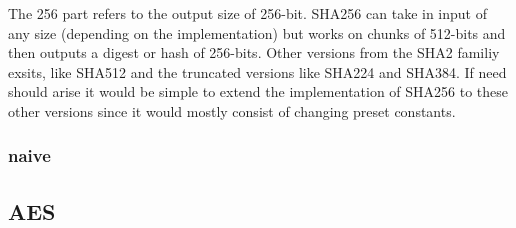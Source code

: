 \documentclass[a4paper]{article}
\begin{document}
The 256 part refers to the output size of 256-bit.
SHA256 can take in input of any size (depending on the implementation) but works
on chunks of 512-bits and then outputs a digest or hash of 256-bits.
Other versions from the SHA2 familiy exsits, like SHA512 and the truncated
versions like SHA224 and SHA384. If need should arise it would be simple to extend
the implementation of SHA256 to these other versions since it would mostly
consist of changing preset constants.

\subsubsection{naive}
\label{AESnaive}
\subsection{AES}
\label{sec:org82bf64b}
\end{document}
